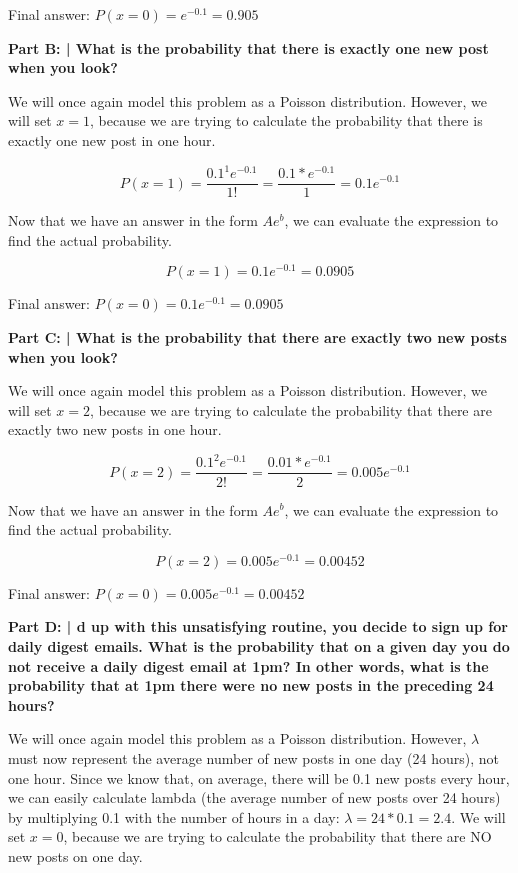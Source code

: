 \documentclass{article}
\begin{document}
 Final answer: $P(x=0) = e^{-0.1} = 0.905$\newline
 
 \textbf{Part B: | What is the probability that there is exactly one new post when you look?}\newline
 
 We will once again model this problem as a Poisson distribution. However, we will set $x=1$, because we are trying to calculate the probability that there is exactly one new post in one hour.
 
 \[P(x=1) = \frac{0.1^1e^{-0.1}}{1!} = \frac{0.1*e^{-0.1}}{1} = 0.1e^{-0.1}\]
 
 Now that we have an answer in the form $Ae^b$, we can evaluate the expression to find the actual probability.
 
 \[P(x=1) = 0.1e^{-0.1} = 0.0905\]
 
 Final answer: $P(x=0) = 0.1e^{-0.1} = 0.0905$\newline
 
 \textbf{Part C: | What is the probability that there are exactly two new posts when you look?}\newline
 
 We will once again model this problem as a Poisson distribution. However, we will set $x=2$, because we are trying to calculate the probability that there are exactly two new posts in one hour.
 
 \[P(x=2) = \frac{0.1^2e^{-0.1}}{2!} = \frac{0.01*e^{-0.1}}{2} = 0.005e^{-0.1}\]
 
 Now that we have an answer in the form $Ae^b$, we can evaluate the expression to find the actual probability.
 
 \[P(x=2) = 0.005e^{-0.1} = 0.00452\]
 
 Final answer: $P(x=0) = 0.005e^{-0.1} = 0.00452$\newline
 
 \textbf{Part D: | d up with this unsatisfying routine, you decide to sign up for daily digest emails. What is the probability that on a given day you do not receive a daily digest email at 1pm? In other words, what is the probability that at 1pm there were no new posts in the preceding 24 hours?}\newline
 
 We will once again model this problem as a Poisson distribution. However, $\lambda$ must now represent the average number of new posts in one day (24 hours), not one hour. Since we know that, on average, there will be 0.1 new posts every hour, we can easily calculate lambda (the average number of new posts over 24 hours) by multiplying 0.1 with the number of hours in a day: $\lambda=24*0.1=2.4$. We will set $x=0$, because we are trying to calculate the probability that there are NO new posts on one day.
 
\end{document}
